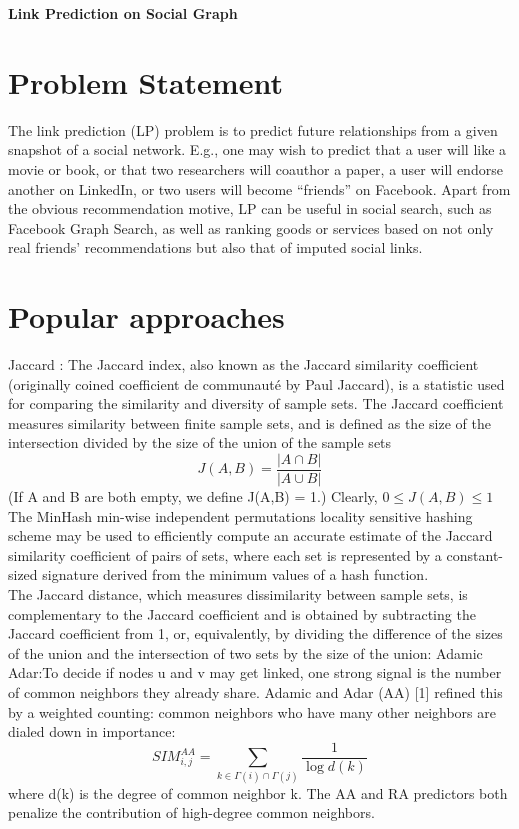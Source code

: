 \begin{center} \huge { \textbf{
     Link Prediction on Social Graph}} 
\end{center}
\newpage
\section*{Problem Statement}
The link prediction (LP) problem is to predict future relationships from a given snapshot of a social network. E.g., one may wish to predict that a user will like a movie or book, or that two researchers will coauthor a paper, a user will endorse another on LinkedIn, or two users will become “friends” on Facebook. Apart from the obvious recommendation motive, LP can be useful in social search, such as Facebook Graph Search, as well as ranking goods or services based on not only real friends’ recommendations but also that of imputed social links.

\section*{Popular approaches}
Jaccard : The Jaccard index, also known as the Jaccard similarity coefficient (originally coined coefficient de communauté by Paul Jaccard), is a statistic used for comparing the similarity and diversity of sample sets. The Jaccard coefficient measures similarity between finite sample sets, and is defined as the size of the intersection divided by the size of the union of the sample sets
\begin{equation}
J(A,B) = \frac{\left\vert A \cap B \right\vert}{\left\vert A \cup B \right\vert}
\end{equation}
(If A and B are both empty, we define J(A,B) = 1.) Clearly,
$0 \leq J(A,B) \leq 1$
The MinHash min-wise independent permutations locality sensitive hashing scheme may be used to efficiently compute an accurate estimate of the Jaccard similarity coefficient of pairs of sets, where each set is represented by a constant-sized signature derived from the minimum values of a hash function.\\
The Jaccard distance, which measures dissimilarity between sample sets, is complementary to the Jaccard coefficient and is obtained by subtracting the Jaccard coefficient from 1, or, equivalently, by dividing the difference of the sizes of the union and the intersection of two sets by the size of the union:
Adamic Adar:To decide if nodes u and v may get linked, one strong signal is the number of common neighbors they already share. Adamic and Adar (AA) [1] refined this by a weighted counting: common neighbors who have many other neighbors are dialed down in importance:
\begin{equation}
SIM_{i,j}^{AA} = \sum_{k \in \Gamma(i) \cap \Gamma(j)} \frac{1}{\log {d(k)}}
\end{equation}
where d(k) is the degree of common neighbor k. The AA and RA predictors both penalize the contribution of high-degree common neighbors.


